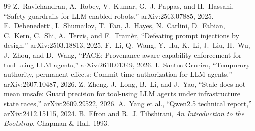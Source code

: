 \documentclass[10pt,twocolumn,a4paper]{article}
\begin{document}
{\begin{thebibliography}{99}
 Z.~Ravichandran, A.~Robey, V.~Kumar, G.~J. Pappas, and H.~Hassani, ``Safety
  guardrails for LLM-enabled robots,'' arXiv:2503.07885, 2025.
 E.~Debenedetti, I.~Shumailov, T.~Fan, J.~Hayes, N.~Carlini, D.~Fabian, C.~Kern, C.~Shi,
  A.~Terzis, and F.~Tram\`er, ``Defeating prompt injections by design,'' arXiv:2503.18813, 2025.
 F.~Li, Q.~Wang, Y.~Hu, K.~Li, J.~Liu, H.~Wu, J.~Zhou, and D.~Wang, ``PACE:
  Provenance-aware capability enforcement for tool-using LLM agents,'' arXiv:2610.01349, 2026.
 I.~Santos-Grueiro, ``Temporary authority, permanent effects: Commit-time
  authorization for LLM agents,'' arXiv:2607.10487, 2026.
 Z.~Zheng, J.~Long, B.~Li, and J.~Yao, ``Stale does not mean unsafe: Guard precision for
  tool-using LLM agents under infrastructure state races,'' arXiv:2609.29522, 2026.
 A.~Yang et al., ``Qwen2.5 technical report,'' arXiv:2412.15115, 2024.
 B.~Efron and R.~J. Tibshirani, \emph{An Introduction to the Bootstrap}. Chapman \& Hall,
  1993.
\end{thebibliography}
}

\newpage
\appendix
\end{document}
